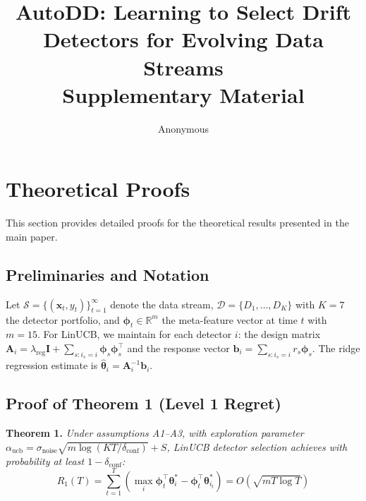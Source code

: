 \documentclass[11pt]{article}
\begin{document}
\title{\Large \textbf{AutoDD: Learning to Select Drift Detectors for Evolving Data Streams}\\
\Large Supplementary Material}

\author{Anonymous}
\date{}

\maketitle

\appendix

\section{Theoretical Proofs}\label{appendix:proofs}

This section provides detailed proofs for the theoretical results presented in the main paper.

\subsection{Preliminaries and Notation}

Let $\mathcal{S} = \{(\mathbf{x}_t, y_t)\}_{t=1}^{\infty}$ denote the data stream, $\mathcal{D} = \{D_1, \ldots, D_K\}$ with $K=7$ the detector portfolio, and $\boldsymbol{\phi}_t \in \mathbb{R}^m$ the meta-feature vector at time $t$ with $m=15$. For LinUCB, we maintain for each detector $i$: the design matrix $\mathbf{A}_i = \lambda_{\text{reg}}\mathbf{I} + \sum_{s:i_s=i} \boldsymbol{\phi}_s \boldsymbol{\phi}_s^\top$ and the response vector $\mathbf{b}_i = \sum_{s:i_s=i} r_s \boldsymbol{\phi}_s$. The ridge regression estimate is $\hat{\boldsymbol{\theta}}_i = \mathbf{A}_i^{-1} \mathbf{b}_i$.

\subsection{Proof of Theorem 1 (Level 1 Regret)}

\textbf{Theorem 1.} \textit{Under assumptions A1--A3, with exploration parameter $\alpha_{\text{ucb}} = \sigma_{\text{noise}}\sqrt{m \log(KT/\delta_{\text{conf}})} + S$, LinUCB detector selection achieves with probability at least $1 - \delta_{\text{conf}}$:}
\begin{equation}
R_1(T) = \sum_{t=1}^{T} \left( \max_{i} \boldsymbol{\phi}_t^\top \boldsymbol{\theta}_i^* - \boldsymbol{\phi}_t^\top \boldsymbol{\theta}_{i_t}^* \right) = O(\sqrt{mT \log T})
\end{equation}
\end{document}
